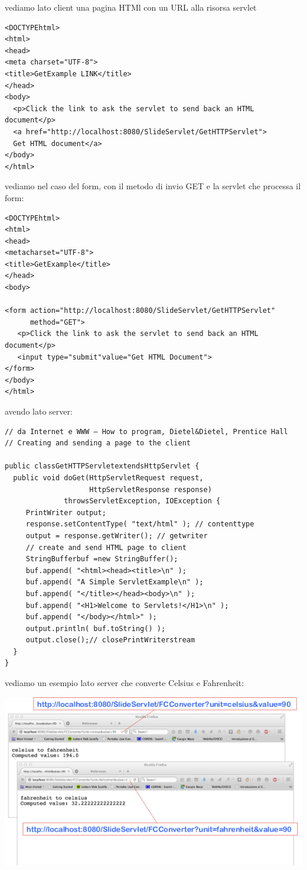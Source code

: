 \documentclass[a4paper,12pt, oneside]{book}
\begin{document}
vediamo lato client una pagina HTMl con un URL alla risorsa servlet
\begin{verbatim}
<DOCTYPEhtml>
<html>
<head>
<meta charset="UTF-8">
<title>GetExample LINK</title>
</head>
<body>
  <p>Click the link to ask the servlet to send back an HTML document</p>
  <a href="http://localhost:8080/SlideServlet/GetHTTPServlet"> 
  Get HTML document</a>
</body>
</html>
\end{verbatim}
vediamo nel caso del form, con il metodo di invio GET e la servlet che processa il form:
\begin{verbatim}
<DOCTYPEhtml>
<html>
<head>
<metacharset="UTF-8">
<title>GetExample</title>
</head>
<body>

<form action="http://localhost:8080/SlideServlet/GetHTTPServlet"
      method="GET">
   <p>Click the link to ask the servlet to send back an HTML document</p>
   <input type="submit"value="Get HTML Document">
</form>
</body>
</html>
\end{verbatim}
\newpage
avendo lato server:
\begin{verbatim}
// da Internet e WWW – How to program, Dietel&Dietel, Prentice Hall
// Creating and sending a page to the client

public classGetHTTPServletextendsHttpServlet {
  public void doGet(HttpServletRequest request,
                    HttpServletResponse response)
              throwsServletException, IOException {
     PrintWriter output;
     response.setContentType( "text/html" ); // contenttype
     output = response.getWriter(); // getwriter
     // create and send HTML page to client
     StringBufferbuf =new StringBuffer();
     buf.append( "<html><head><title>\n" );
     buf.append( "A Simple ServletExample\n" );
     buf.append( "</title></head><body>\n" );
     buf.append( "<H1>Welcome to Servlets!</H1>\n" );
     buf.append( "</body></html>" );
     output.println( buf.toString() );
     output.close();// closePrintWriterstream
  }
}
\end{verbatim}
vediamo un esempio lato server che converte Celsius e Fahrenheit:
\begin{center}
	\includegraphics[scale=0.7]{img/cel.png}
\end{center}
\end{document}
